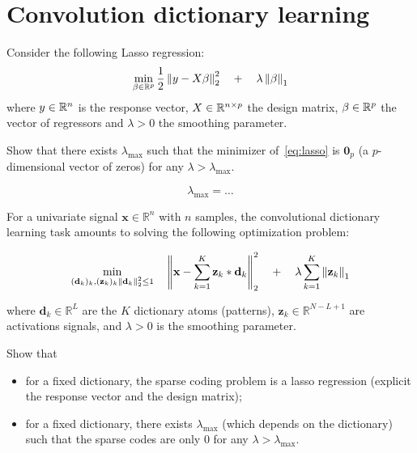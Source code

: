 \documentclass[11pt]{article}
\begin{document}
\section{Convolution dictionary learning}

\begin{exercise}
Consider the following Lasso regression:
\begin{equation}\label{eq:lasso}
    \min_{\beta\in\mathbb{R}^p} \frac{1}{2}\left\lVert y-X\beta\right\rVert^2_2 \quad + \quad \lambda \left\lVert\beta\right\rVert_1
\end{equation}
where $y\in\mathbb{R}^n$ is the response vector, $X\in\mathbb{R}^{n\times p}$ the design matrix, $\beta\in\mathbb{R}^p$ the vector of regressors and $\lambda>0$ the smoothing parameter.

Show that there exists $\lambda_{\max}$ such that the minimizer of~\eqref{eq:lasso} is $\mathbf{0}_p$ (a $p$-dimensional vector of zeros) for any $\lambda > \lambda_{\max}$. 
\end{exercise}

\begin{solution}  %

\begin{equation}
    \lambda_{\max} = \dots
\end{equation}

\end{solution}

\begin{exercise}
For a univariate signal $\mathbf{x}\in\mathbb{R}^n$ with $n$ samples, the convolutional dictionary learning task amounts to solving the following optimization problem:

\begin{equation}
\min_{(\mathbf{d}_k)_k, (\mathbf{z}_k)_k \\ \left\lVert\mathbf{d}_k\right\rVert_2^2\leq 1} \quad\left\lVert\mathbf{x} - \sum_{k=1}^K \mathbf{z}_k * \mathbf{d}_k \right\rVert^2_2 \quad + \quad\lambda \sum_{k=1}^K \left\lVert\mathbf{z}_k\right\rVert_1
\end{equation}

where $\mathbf{d}_k\in\mathbb{R}^L$ are the $K$ dictionary atoms (patterns), $\mathbf{z}_k\in\mathbb{R}^{N-L+1}$ are activations signals, and $\lambda>0$ is the smoothing parameter.

Show that
\begin{itemize}
    \item for a fixed dictionary, the sparse coding problem is a lasso regression (explicit the response vector and the design matrix);
    \item for a fixed dictionary, there exists $\lambda_{\max}$ (which depends on the dictionary) such that the sparse codes are only 0 for any $\lambda > \lambda_{\max}$. 
\end{itemize}
\end{exercise}
\end{document}
